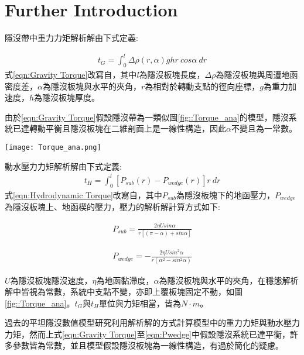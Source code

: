 \section{Further Introduction}

隱沒帶中重力力矩解析解由下式定義:

\begin{align}
    t_G=\int^l_0 \Delta\rho(r,\alpha)ghr\ cos\alpha\ dr
    \label{eqn:Gravity Torque}
\end{align}
式\ref{eqn:Gravity Torque}改寫自\citealp{stevenson1977angle}，其中$l$為隱沒板塊長度，$\Delta\rho$為隱沒板塊與周遭地函密度差，$\alpha$為隱沒板塊與水平的夾角，$r$為相對於轉動支點的徑向座標，$g$為重力加速度，$h$為隱沒板塊厚度。

由於\ref{eqn:Gravity Torque}假設隱沒帶為一類似圖\ref{fig::Torque_ana}的模型，隱沒系統已達轉動平衡且隱沒板塊在二維剖面上是一線性構造，因此$\alpha$不變且為一常數。

\begin{figure*}[hb]
    \centering
    \texttt{[image: Torque\_ana.png]}
    \caption[簡易隱沒帶二為剖面示意圖]{簡易隱沒帶二為剖面示意圖。摘自\citealp{stevenson1977angle}。}
    \label{fig::Torque_ana}
\end{figure*}

動水壓力力矩解析解由下式定義:
\begin{align}
    t_H=\int^l_0 [P_{sub}(r)-P_{wedge}(r)]r\ dr
    \label{eqn:Hydrodynamic Torque}
\end{align}
式\ref{eqn:Hydrodynamic Torque}改寫自\citealp{McKenzie1969}，其中$P_{sub}$為隱沒板塊下的地函壓力，$P_{wedge}$為隱沒板塊上、地函楔的壓力，壓力的解析解計算方式如下:

\begin{align}
    P_{sub}=\frac{2 \eta U sin \alpha}{r[(\pi - \alpha)+sin\alpha]}
    \label{eqn:Psub}
\end{align}

\begin{align}
    P_{wedge}=-\frac{2 \eta U sin^{2} \alpha}{r(\alpha^2-sin^2\alpha)}
    \label{eqn:Pwedge}
\end{align}

$U$為隱沒板塊隱沒速度，$\eta$為地函黏滯度，$\alpha$為隱沒板塊與水平的夾角，在穩態解析解中皆視為常數，系統中支點不變，亦即上覆板塊固定不動，如圖\ref{fig::Torque_ana}。$t_G$與$t_H$單位與力矩相當，皆為$N\cdot m$。

過去的平坦隱沒數值模型研究利用解析解的方式計算模型中的重力力矩與動水壓力力矩，然而上式\ref{eqn:Gravity Torque}至\ref{eqn:Pwedge}中假設隱沒系統已達平衡，許多參數皆為常數，並且模型假設隱沒板塊為一線性構造，有過於簡化的疑慮。